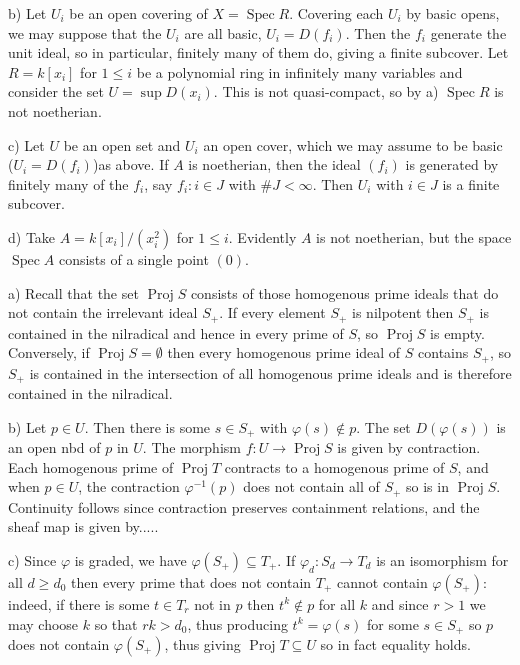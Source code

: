 \documentclass{report}
\DeclareMathOperator{\Spec}{Spec}
\DeclareMathOperator{\Proj}{Proj}
\begin{document}
\noindent
b)	Let $U_i$ be an open covering of $X=\Spec R$.  Covering each $U_i$ by basic opens, we may suppose
that the $U_i$ are all basic, $U_i=D(f_i)$.  Then the $f_i$ generate the unit ideal, so in particular,
finitely many of them do, giving a finite subcover.	
Let $R=k[x_i]$ for $1\le i$ be a polynomial ring in infinitely many variables and consider
the set $U=\sup D(x_i)$.  This is not quasi-compact, so by a) $\Spec R$ is not noetherian.

\noindent
c) Let $U$ be an open set and $U_i$ an open cover, which we may assume to be basic ($U_i=D(f_i)$)as above.
If $A$ is noetherian, then the ideal $(f_i)$ is generated by finitely many of the $f_i$, say $f_i:i\in J$ with $\#J<\infty$.
Then $U_i$ with $i\in J$ is a finite subcover.


\noindent
d) Take $A=k[x_i]/(x_i^2)$ for $1\le i$.  Evidently $A$ is not noetherian, but the space $\Spec A$ consists of a single point
$(0)$.

\bigskip
{}	a)	Recall that the set $\Proj S$ consists of those homogenous prime ideals that do not contain the irrelevant 
ideal $S_+$.  If every element $S_+$ is nilpotent then $S_+$ is contained in the nilradical and hence in every prime
of $S$, so $\Proj S$ is empty.  Conversely, if $\Proj S=\emptyset$ then every homogenous prime
ideal of $S$ contains $S_+$, so $S_+$ is contained in the intersection of all homogenous prime ideals
and is therefore contained in the nilradical.

\noindent
b)	Let $p\in U$.  Then there is some $s\in S_+$ with $\varphi(s)\not\in p$.  The set $D(\varphi(s))$ is an open
nbd of $p$ in $U$.	The morphism $f:U\rightarrow \Proj S$ is given by contraction.  Each homogenous prime
of $\Proj T$ contracts to a homogenous prime of $S$, and when $p\in U$, the contraction $\varphi^{-1}(p)$
does not contain all of $S_+$ so is in $\Proj S$.  Continuity follows since contraction preserves containment
relations, and the sheaf map is given by..... 

\noindent
c)	Since $\varphi$ is graded, we have $\varphi(S_+)\subseteq T_+$.	
If $\varphi_d:S_d\rightarrow T_d$ is an isomorphism for all $d\ge d_0$ then every prime that does not contain
$T_+$ cannot contain $\varphi(S_+)$: indeed, if there is some $t\in T_r$ not in $p$ then $t^k\not\in p$ for all $k$
and since $r>1$ we may choose $k$ so that $rk>d_0$, thus producing $t^k=\varphi(s)$ for some $s\in S_+$
so $p$ does not contain $\varphi(S_+)$, thus giving $\Proj T\subseteq U$ so in fact equality holds.
\end{document}

